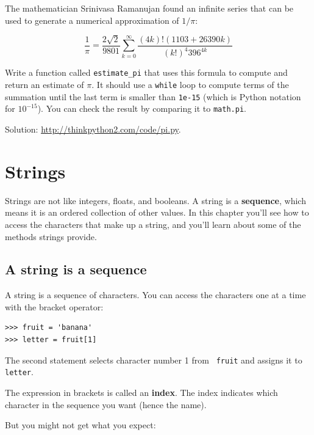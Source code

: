 \documentclass[10pt]{book}
\begin{document}
\begin{exercise}

The mathematician Srinivasa Ramanujan found an
infinite series
that can be used to generate a numerical
approximation of $1 / \pi$:

\[ \frac{1}{\pi} = \frac{2\sqrt{2}}{9801}
\sum^\infty_{k=0} \frac{(4k)!(1103+26390k)}{(k!)^4 396^{4k}} \]

Write a function called \verb"estimate_pi" that uses this formula
to compute and return an estimate of $\pi$.  It should use a {\tt while}
loop to compute terms of the summation until the last term is
smaller than {\tt 1e-15} (which is Python notation for $10^{-15}$).
You can check the result by comparing it to {\tt math.pi}.

Solution: \url{http://thinkpython2.com/code/pi.py}.

\end{exercise}


\chapter{Strings}
\label{strings}

Strings are not like integers, floats, and booleans.  A string
is a {\bf sequence}, which means it is
an ordered collection of other values.  In this chapter you'll see
how to access the characters that make up a string, and you'll
learn about some of the methods strings provide.


\section{A string is a sequence}

A string is a sequence of characters.
You can access the characters one at a time with the
bracket operator:

\begin{verbatim}
>>> fruit = 'banana'
>>> letter = fruit[1]
\end{verbatim}
%
The second statement selects character number 1 from {\tt
fruit} and assigns it to {\tt letter}.

The expression in brackets is called an {\bf index}.
The index indicates which character in the sequence you
want (hence the name).

But you might not get what you expect:
\end{document}
